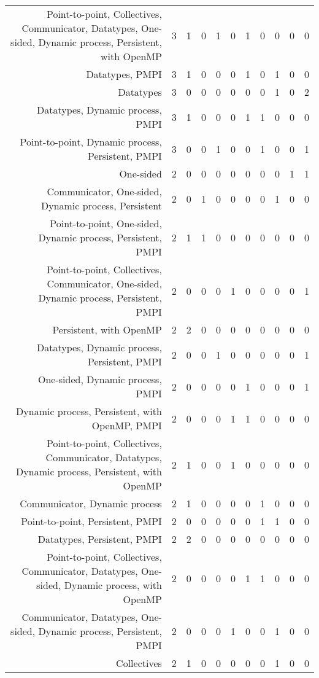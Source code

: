 {\begin{landscape}
\begin{longtable}[htb]{r|c|c|c|c|c|c|c|c|c|c}
{Point-to-point, Collectives, Communicator, Datatypes, One-sided, Dynamic process, Persistent, with OpenMP} & 3 & 1 & 0 & 1 & 0 & 1 & 0 & 0 & 0 & 0 \\%
{Datatypes, PMPI} & 3 & 1 & 0 & 0 & 0 & 1 & 0 & 1 & 0 & 0 \\%
{Datatypes} & 3 & 0 & 0 & 0 & 0 & 0 & 0 & 1 & 0 & 2 \\%
{Datatypes, Dynamic process, PMPI} & 3 & 1 & 0 & 0 & 0 & 1 & 1 & 0 & 0 & 0 \\%
{Point-to-point, Dynamic process, Persistent, PMPI} & 3 & 0 & 0 & 1 & 0 & 0 & 1 & 0 & 0 & 1 \\%
{One-sided} & 2 & 0 & 0 & 0 & 0 & 0 & 0 & 0 & 1 & 1 \\%
{Communicator, One-sided, Dynamic process, Persistent} & 2 & 0 & 1 & 0 & 0 & 0 & 0 & 1 & 0 & 0 \\%
{Point-to-point, One-sided, Dynamic process, Persistent, PMPI} & 2 & 1 & 1 & 0 & 0 & 0 & 0 & 0 & 0 & 0 \\%
{Point-to-point, Collectives, Communicator, One-sided, Dynamic process, Persistent, PMPI} & 2 & 0 & 0 & 0 & 1 & 0 & 0 & 0 & 0 & 1 \\%
{Persistent, with OpenMP} & 2 & 2 & 0 & 0 & 0 & 0 & 0 & 0 & 0 & 0 \\%
{Datatypes, Dynamic process, Persistent, PMPI} & 2 & 0 & 0 & 1 & 0 & 0 & 0 & 0 & 0 & 1 \\%
{One-sided, Dynamic process, PMPI} & 2 & 0 & 0 & 0 & 0 & 1 & 0 & 0 & 0 & 1 \\%
{Dynamic process, Persistent, with OpenMP, PMPI} & 2 & 0 & 0 & 0 & 1 & 1 & 0 & 0 & 0 & 0 \\%
{Point-to-point, Collectives, Communicator, Datatypes, Dynamic process, Persistent, with OpenMP} & 2 & 1 & 0 & 0 & 1 & 0 & 0 & 0 & 0 & 0 \\%
{Communicator, Dynamic process} & 2 & 1 & 0 & 0 & 0 & 0 & 1 & 0 & 0 & 0 \\%
{Point-to-point, Persistent, PMPI} & 2 & 0 & 0 & 0 & 0 & 0 & 1 & 1 & 0 & 0 \\%
{Datatypes, Persistent, PMPI} & 2 & 2 & 0 & 0 & 0 & 0 & 0 & 0 & 0 & 0 \\%
{Point-to-point, Collectives, Communicator, Datatypes, One-sided, Dynamic process, with OpenMP} & 2 & 0 & 0 & 0 & 0 & 1 & 1 & 0 & 0 & 0 \\%
{Communicator, Datatypes, One-sided, Dynamic process, Persistent, PMPI} & 2 & 0 & 0 & 0 & 1 & 0 & 0 & 1 & 0 & 0 \\%
{Collectives} & 2 & 1 & 0 & 0 & 0 & 0 & 0 & 1 & 0 & 0 \\%

\end{longtable}
\end{landscape}}
